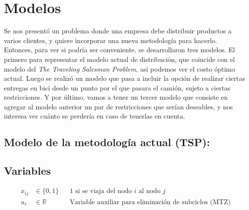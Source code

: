 \documentclass{article}
\begin{document}


\maketitle

\newpage

\section{Modelos}
Se nos presentó un problema donde una empresa debe distribuir productos a varios clientes, y quiere incorporar una nueva metodología para hacerlo. Entonces, para ver si podría ser conveniente, se desarrollaron tres modelos. El primero para representar el modelo actual de distribución, que coincide con el modelo del \textit{The Traveling Salesman Problem}, así podemos ver el costo óptimo actual. Luego se realizó un modelo que pasa a incluir la opción de realizar ciertas entregas en bici desde un punto por el que pasara el camión, sujeto a ciertas restricciones. Y por último, vamos a tener un tercer modelo que consiste en agregar al modelo anterior un par de restricciones que serían deseables, y nos interesa ver cuánto se perdería en caso de tenerlas en cuenta. 

\subsection{Modelo de la metodología actual (TSP):} \label{modelo_actual}
\subsection*{Variables}
\begin{align*}
    x_{ij} &\in \{0,1\} && \text{1 si se viaja del nodo } i \text{ al nodo } j \\
    u_i &\in \mathbb{R} && \text{Variable auxiliar para eliminación de subciclos (MTZ)}
\end{align*}
\end{document}
